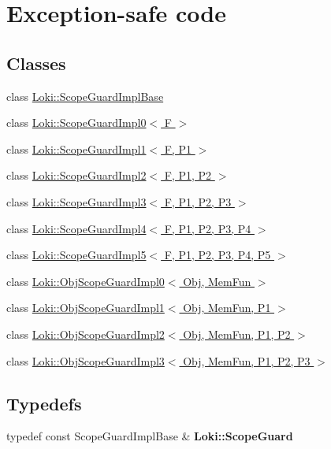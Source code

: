 \hypertarget{group__ExceptionGroup}{}\section{Exception-\/safe code}
\label{group__ExceptionGroup}
\subsection*{Classes}
\begin{DoxyCompactItemize}
\item 
class \hyperlink{classLoki_1_1ScopeGuardImplBase}{Loki\+::\+Scope\+Guard\+Impl\+Base}
\item 
class \hyperlink{classLoki_1_1ScopeGuardImpl0}{Loki\+::\+Scope\+Guard\+Impl0$<$ F $>$}
\item 
class \hyperlink{classLoki_1_1ScopeGuardImpl1}{Loki\+::\+Scope\+Guard\+Impl1$<$ F, P1 $>$}
\item 
class \hyperlink{classLoki_1_1ScopeGuardImpl2}{Loki\+::\+Scope\+Guard\+Impl2$<$ F, P1, P2 $>$}
\item 
class \hyperlink{classLoki_1_1ScopeGuardImpl3}{Loki\+::\+Scope\+Guard\+Impl3$<$ F, P1, P2, P3 $>$}
\item 
class \hyperlink{classLoki_1_1ScopeGuardImpl4}{Loki\+::\+Scope\+Guard\+Impl4$<$ F, P1, P2, P3, P4 $>$}
\item 
class \hyperlink{classLoki_1_1ScopeGuardImpl5}{Loki\+::\+Scope\+Guard\+Impl5$<$ F, P1, P2, P3, P4, P5 $>$}
\item 
class \hyperlink{classLoki_1_1ObjScopeGuardImpl0}{Loki\+::\+Obj\+Scope\+Guard\+Impl0$<$ Obj, Mem\+Fun $>$}
\item 
class \hyperlink{classLoki_1_1ObjScopeGuardImpl1}{Loki\+::\+Obj\+Scope\+Guard\+Impl1$<$ Obj, Mem\+Fun, P1 $>$}
\item 
class \hyperlink{classLoki_1_1ObjScopeGuardImpl2}{Loki\+::\+Obj\+Scope\+Guard\+Impl2$<$ Obj, Mem\+Fun, P1, P2 $>$}
\item 
class \hyperlink{classLoki_1_1ObjScopeGuardImpl3}{Loki\+::\+Obj\+Scope\+Guard\+Impl3$<$ Obj, Mem\+Fun, P1, P2, P3 $>$}
\end{DoxyCompactItemize}
\subsection*{Typedefs}
\begin{DoxyCompactItemize}
\item 
\hypertarget{group__ExceptionGroup_ga604eab98707ec8dd7033e34bb04c3257}{}typedef const Scope\+Guard\+Impl\+Base \& {\bfseries Loki\+::\+Scope\+Guard}\label{group__ExceptionGroup_ga604eab98707ec8dd7033e34bb04c3257}

\end{DoxyCompactItemize}
